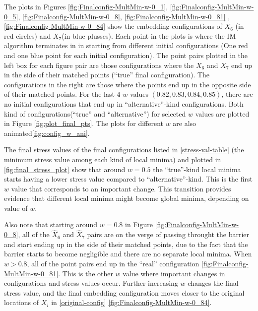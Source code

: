\documentclass[12pt,oneside,final]{thesis}\usepackage[]{graphicx}\usepackage[]{color}
\begin{document}
The plots in Figures \ref{fig:Finalconfig-MultMin-w-0_1}, \ref{fig:Finalconfig-MultMin-w-0_5}, \ref{fig:Finalconfig-MultMin-w-0_8}, \ref{fig:Finalconfig-MultMin-w-0_81} , \ref{fig:Finalconfig-MultMin-w-0_84} show the  embedding configurations of ${X}_6$ (in red circles) and ${X}_7$(in blue plusses). Each point in the plots is where the IM algorithm terminates in in starting from different initial configurations (One red and one blue point for each  initial configuration). The point pairs plotted in the left box for each figure pair are those configurations  where the  ${X}_6$ and ${X}_7$ end up in the side of their matched points (``true'' final configuration). The configurations in the right are those where the points end up in the opposite side of their matched points. For the last 4 $w$ values $(0.82,0.83,0.84,0.85)$, there are no initial configurations that end up in ``alternative''-kind configurations. Both kind of  configurations(``true'' and ``alternative'') for selected $w$ values are plotted in Figure \ref{fig:plot_final_pts}. The plots for different $w$ are also animated\ref{fig:config_w_ani}.

The final stress values of the final configurations listed in  \autoref{stress-val-table} (the minimum stress value among each kind of local minima) and plotted in \autoref{fig:final_stress_plot} show that around $w=0.5$ the  ``true''-kind local minima   starts having a lower stress value compared to ``alternative''-kind.  This is the first $w$ value that corresponds to an important change. This transition provides evidence that different local minima might become global minima, depending on value of $w$.

Also note that starting around $w=0.8$ in Figure \ref{fig:Finalconfig-MultMin-w-0_8}, all of the $\hat{X}_6$ and $\hat{X}_7$  pairs are on the verge of passing throught the barrier and start ending up in the side of their matched points, due to the fact that the barrier starts to become negligible and there are no separate local minima. When $w>0.8$, all of the point pairs end up in  the ``real'' configuration \ref{fig:Finalconfig-MultMin-w-0_81}. This is the other $w$ value where important changes in configurations and stress values occur. Further increasing $w$ changes the final stress value, and  the final embedding configuration moves closer to the original locations of $X_{i}$ in \ref{original-config} \ref{fig:Finalconfig-MultMin-w-0_84}.
\end{document}
